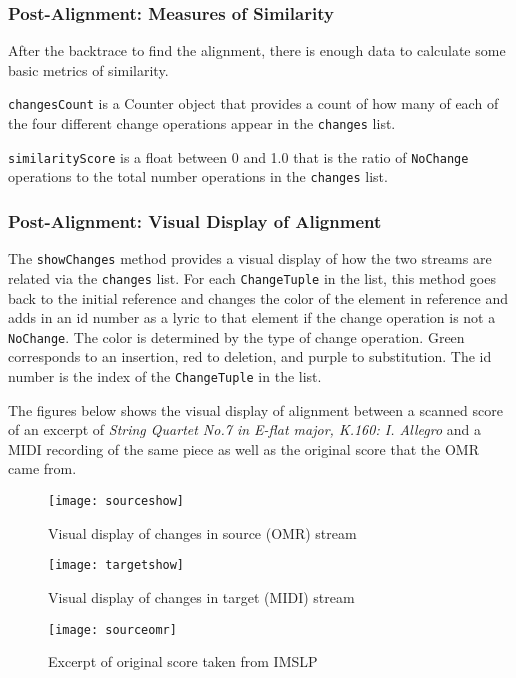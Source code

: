 \subsubsection{Post-Alignment: Measures of Similarity}
After the backtrace to find the alignment, there is enough data to calculate some basic metrics of similarity. 

\texttt{changesCount} is a Counter object that provides a count of how many of each of the four different change operations appear in the \texttt{changes} list. 

\texttt{similarityScore} is a float between 0 and 1.0 that is the ratio of \texttt{NoChange} operations to the total number operations in the \texttt{changes} list.
\subsubsection{Post-Alignment: Visual Display of Alignment}
The \texttt{showChanges} method provides a visual display of how the two streams are related via the \texttt{changes} list. For each \texttt{ChangeTuple} in the list, this method goes back to the initial reference and changes the color of the element in reference and adds in an id number as a lyric to that element if the change operation is not a \texttt{NoChange}. The color is determined by the type of change operation. Green corresponds to an insertion, red to deletion, and purple to substitution. The id number is the index of the \texttt{ChangeTuple} in the list. 

The figures below shows the visual display of alignment between a scanned score of an excerpt of \textit{String Quartet No.7 in E-flat major, K.160: I. Allegro} and a MIDI recording of the same piece as well as the original score that the OMR came from. 

\begin{figure}[!ht]
\centering
\texttt{[image: sourceshow]}
\caption{Visual display of changes in source (OMR) stream}
\end{figure}

\begin{figure}[!ht]
\centering
\texttt{[image: targetshow]}
\caption{Visual display of changes in target (MIDI) stream}
\end{figure}

\begin{figure}[!ht]
\centering
\texttt{[image: sourceomr]}
\caption{Excerpt of original score taken from IMSLP}
\end{figure}

